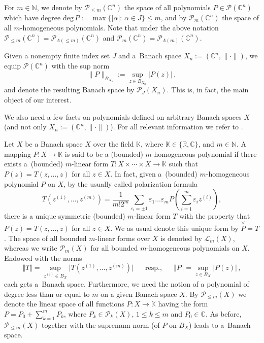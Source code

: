\documentclass[12pt]{amsart}
\numberwithin{subsection}{section}
\theoremstyle{definition}
\theoremstyle{remark}
\begin{document}
For  $m \in \mathbb{N}$, we denote by  $\mathcal{P}_{\leq m}(\mathbb{C}^n)$ the space of all   polynomials
$P \in \mathcal{P}(\mathbb{C}^n)$ which have degree $\text{deg}\,P := \max\{|\alpha|:\, \alpha\in J \} \leq m$, and by $\mathcal{P}_{m }(\mathbb{C}^n)$ the space of all $m$-homoge\-neous
polynomials. Note that under the above notation
$\mathcal{P}_{\leq m}(\mathbb{C}^n)=  \mathcal{P}_{\Lambda(\leq  m)}(\mathbb{C}^n)$
and
$\mathcal{P}_{m}(\mathbb{C}^n)=  \mathcal{P}_{\Lambda(m)}(\mathbb{C}^n)$.

Given a nonempty  finite  index set $J$ and a~Banach space $X_n := (\mathbb{C}^n,\|\cdot\|)$, we equip $\mathcal{P}(\mathbb{C}^n)$
with the sup norm
\[
\|P\|_{B_{X_n}} := \sup_{z\in B_{X_n}} |P(z)|\,,
\]
and  denote the resulting Banach space by $\mathcal{P}_J(X_n)$. This is, in fact, the main object of our interest.


We  also need a few facts on polynomials defined on arbitrary Banach spaces $X$ (and not only $X_n:= (\mathbb{C}^n, \|\cdot\|)$).
For all relevant information we refer to  \cite{defant1992tensor,defant2019libro,dineen1999complex,floret1997natural}.

Let $X$ be a   Banach space $X$ over the field $\mathbb{K}$,  where $\mathbb{K} \in \{\mathbb{R}, \mathbb{C}\}$, and $m \in \mathbb{N}$.
A mapping $P\colon X\to \mathbb{K}$ is said to be a (bounded) $m$-homogeneous  polynomial if there exists a~(bounded) $m$-linear form
$T\colon X\times\cdots \times X \to \mathbb{K}$  such that $P(z)=T(z,\dots,z)$ for all $z\in X$. In fact, given a~(bounded) $m$-homogeneous
polynomial $P$ on $X$, by the usually called polarization formula
\begin{equation}\label{formula de polarizacion}
T(z^{(1)}, \dots, z^{(m)}) = \frac{1}{m!2^m} \sum_{\varepsilon_i = \pm 1} \varepsilon_1 \dots \varepsilon_m P\left(\sum_{i=1}^m \varepsilon_i z^{(i)}\right),
\end{equation}
there is a unique symmetric (bounded) $m$-linear form $T$ with the property that $P(z)=T(z,\dots,z)$ for all $z\in X$. We as usual denote
this unique form by $\overset{\vee}{P}=T$. The space of all bounded $m$-linear forms over $X$ is denoted by $\mathcal L_m(X)$, whereas we
write $\mathcal{P}_m(X)$ for all bounded $m$-homogeneous polynomials on $X$. Endowed with the norms
\[
\Vert T \Vert = \sup_{z^{(i)} \in B_{X}} \vert T(z^{(1)}, \dots, z^{(m)}) \vert \,\,\,\,\,\,\,\,\,\,\text{resp.,} \,\,\,\,\,\,\,\,\,\,
\Vert P \Vert = \sup_{z \in B_{X}} \vert P(z) \vert \,,
\]
each gets a~Banach space. Furthermore, we need the notion of a polynomial of degree less than or equal to $m$ on a given Banach space $X$.
By $\mathcal{P}_{\leq m}(X)$ we denote the linear space of all functions $P\colon X \to \mathbb{K}$ having the  form $P = P_0 + \sum_{k=1}^m P_k$,
where $P_k \in \mathcal{P}_k(X), \, 1 \leq k \leq m$ and $P_0 \in \mathbb{C}$. As before, $\mathcal{P}_{\leq m}(X)$ together with the supremum
norm (of $P$ on $B_X$) leads to a~Banach space.
\end{document}
